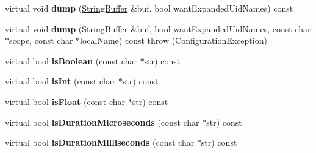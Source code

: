 \begin{DoxyCompactItemize}
\item 
\hypertarget{classCONFIG4CPP__NAMESPACE_1_1ConfigurationImpl_a23a21889c6e97da9648b689012fa7c65}{virtual void {\bfseries dump} (\hyperlink{classCONFIG4CPP__NAMESPACE_1_1StringBuffer}{String\-Buffer} \&buf, bool want\-Expanded\-Uid\-Names) const }\label{classCONFIG4CPP__NAMESPACE_1_1ConfigurationImpl_a23a21889c6e97da9648b689012fa7c65}

\item 
\hypertarget{classCONFIG4CPP__NAMESPACE_1_1ConfigurationImpl_afbcc76465b32c674d9a83c00ac8e4e57}{virtual void {\bfseries dump} (\hyperlink{classCONFIG4CPP__NAMESPACE_1_1StringBuffer}{String\-Buffer} \&buf, bool want\-Expanded\-Uid\-Names, const char $\ast$scope, const char $\ast$local\-Name) const   throw (\-Configuration\-Exception)}\label{classCONFIG4CPP__NAMESPACE_1_1ConfigurationImpl_afbcc76465b32c674d9a83c00ac8e4e57}

\item 
\hypertarget{classCONFIG4CPP__NAMESPACE_1_1ConfigurationImpl_a25398c348596cffe8828d23179a0c529}{virtual bool {\bfseries is\-Boolean} (const char $\ast$str) const }\label{classCONFIG4CPP__NAMESPACE_1_1ConfigurationImpl_a25398c348596cffe8828d23179a0c529}

\item 
\hypertarget{classCONFIG4CPP__NAMESPACE_1_1ConfigurationImpl_abd7fa8503b0fc7236570ad813fe6d43b}{virtual bool {\bfseries is\-Int} (const char $\ast$str) const }\label{classCONFIG4CPP__NAMESPACE_1_1ConfigurationImpl_abd7fa8503b0fc7236570ad813fe6d43b}

\item 
\hypertarget{classCONFIG4CPP__NAMESPACE_1_1ConfigurationImpl_a6321555e2fd3515c5b5325e06fea136b}{virtual bool {\bfseries is\-Float} (const char $\ast$str) const }\label{classCONFIG4CPP__NAMESPACE_1_1ConfigurationImpl_a6321555e2fd3515c5b5325e06fea136b}

\item 
\hypertarget{classCONFIG4CPP__NAMESPACE_1_1ConfigurationImpl_a4fe4f25e793384883c18ba70c7ee1518}{virtual bool {\bfseries is\-Duration\-Microseconds} (const char $\ast$str) const }\label{classCONFIG4CPP__NAMESPACE_1_1ConfigurationImpl_a4fe4f25e793384883c18ba70c7ee1518}

\item 
\hypertarget{classCONFIG4CPP__NAMESPACE_1_1ConfigurationImpl_a12e6a8e3c33d0a0f266ba3c41e809416}{virtual bool {\bfseries is\-Duration\-Milliseconds} (const char $\ast$str) const }\label{classCONFIG4CPP__NAMESPACE_1_1ConfigurationImpl_a12e6a8e3c33d0a0f266ba3c41e809416}


\end{DoxyCompactItemize}
